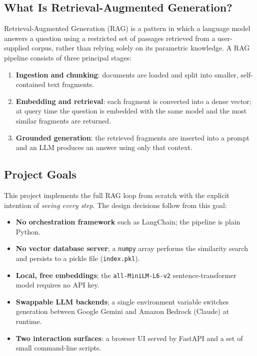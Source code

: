 \documentclass[11pt,a4paper]{article}
\newcommand{\code}[1]{\texttt{#1}}
\begin{document}
\subsection{What Is Retrieval-Augmented Generation?}
Retrieval-Augmented Generation (RAG) is a pattern in which a language model
answers a question using a restricted set of passages retrieved from a
user-supplied corpus, rather than relying solely on its parametric
knowledge. A RAG pipeline consists of three principal stages:
\begin{enumerate}
  \item \textbf{Ingestion and chunking}: documents are loaded and split into
        smaller, self-contained text fragments.
  \item \textbf{Embedding and retrieval}: each fragment is converted into a
        dense vector; at query time the question is embedded with the same
        model and the most similar fragments are returned.
  \item \textbf{Grounded generation}: the retrieved fragments are inserted
        into a prompt and an LLM produces an answer using only that context.
\end{enumerate}

\subsection{Project Goals}
This project implements the full RAG loop from scratch with the explicit
intention of \emph{seeing every step}. The design decisions follow from this
goal:
\begin{itemize}
  \item \textbf{No orchestration framework} such as LangChain; the pipeline
        is plain Python.
  \item \textbf{No vector database server}; a \texttt{numpy} array performs
        the similarity search and persists to a pickle file
        (\code{index.pkl}).
  \item \textbf{Local, free embeddings}; the
        \texttt{all-MiniLM-L6-v2} sentence-transformer model requires no API
        key.
  \item \textbf{Swappable LLM backends}; a single environment variable
        switches generation between Google Gemini and Amazon Bedrock
        (Claude) at runtime.
  \item \textbf{Two interaction surfaces}: a browser UI served by FastAPI
        and a set of small command-line scripts.
\end{itemize}
\end{document}
